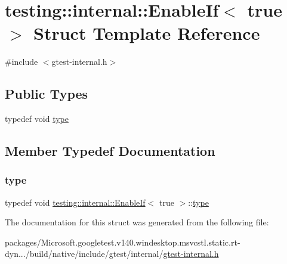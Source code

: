 \hypertarget{structtesting_1_1internal_1_1_enable_if_3_01true_01_4}{}\section{testing\+::internal\+::Enable\+If$<$ true $>$ Struct Template Reference}
\label{structtesting_1_1internal_1_1_enable_if_3_01true_01_4}


{\ttfamily \#include $<$gtest-\/internal.\+h$>$}

\subsection*{Public Types}
\begin{DoxyCompactItemize}
\item 
typedef void \mbox{\hyperlink{structtesting_1_1internal_1_1_enable_if_3_01true_01_4_a9398d803f1fdd99ff41823746f6299ff}{type}}
\end{DoxyCompactItemize}


\subsection{Member Typedef Documentation}
\mbox{\label{structtesting_1_1internal_1_1_enable_if_3_01true_01_4_a9398d803f1fdd99ff41823746f6299ff}} 
\subsubsection{\texorpdfstring{type}{type}}
{\footnotesize\ttfamily typedef void \mbox{\hyperlink{structtesting_1_1internal_1_1_enable_if}{testing\+::internal\+::\+Enable\+If}}$<$ true $>$\+::\mbox{\hyperlink{structtesting_1_1internal_1_1_enable_if_3_01true_01_4_a9398d803f1fdd99ff41823746f6299ff}{type}}}



The documentation for this struct was generated from the following file\+:\begin{DoxyCompactItemize}
\item 
packages/\+Microsoft.\+googletest.\+v140.\+windesktop.\+msvcstl.\+static.\+rt-\/dyn.../build/native/include/gtest/internal/\mbox{\hyperlink{gtest-internal_8h}{gtest-\/internal.\+h}}\end{DoxyCompactItemize}
